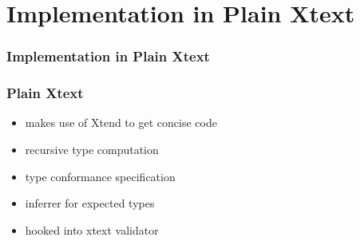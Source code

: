 \section{Implementation in Plain Xtext}

\begin{frame}
  \frametitle{Implementation in Plain Xtext}
  \tableofcontents[currentsection]
\end{frame}

\begin{frame}
  \frametitle{Plain Xtext}
  \begin{itemize}
    \item makes use of Xtend to get concise code
    \item recursive type computation
    \item type conformance specification
    \item inferrer for expected types
    \item hooked into xtext validator
  \end{itemize}

\end{frame}